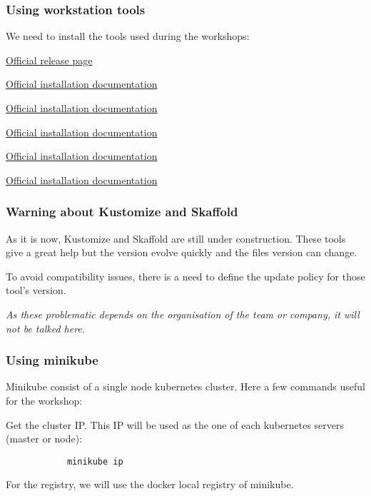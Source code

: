 \begin{frame}
	\frametitle{Using workstation tools}
	
	We need to install the tools used during the workshops:
	\begin{description}[leftmargin=!,labelwidth=\widthof{\bfseries Kustomize}]
		\item[Docker] \href{https://hub.docker.com/search/?type=edition&offering=community}{Official release page}
		\item[Kubectl] \href{https://kubernetes.io/docs/tasks/tools/install-kubectl/}{Official installation documentation}
		\item[Minikube] \href{https://kubernetes.io/docs/tasks/tools/install-minikube/}{Official installation documentation}
		\item[Kustomize] \href{https://github.com/kubernetes-sigs/kustomize/blob/master/docs/INSTALL.md}{Official installation documentation}
		\item[Skaffold] \href{https://skaffold.dev/docs/getting-started/\#installing-skaffold}{Official installation documentation}
		\item[Stern] \href{https://github.com/wercker/stern}{Official installation documentation}
	\end{description}	
\end{frame}

\begin{frame}
	\frametitle{Warning about Kustomize and Skaffold}
	
	As it is now, Kustomize and Skaffold are still under construction. These tools give a great help but the version evolve quickly and the files version can change.
	
	To avoid compatibility issues, there is a need to define the update policy for those tool's version.
	
	\bigskip
	
	\begin{center}
		\textit{As these problematic depends on the organisation of the team or company, it will not be talked here.}
	\end{center}
	
\end{frame}

\begin{frame}[fragile]
	\frametitle{Using minikube}
	
	Minikube consist of a single node kubernetes cluster. Here a few commands useful for the workshop:
	
	\begin{block}{Get the cluster IP. This IP will be used as the one of each kubernetes servers (master or node):}
		\begin{verbatim}
			minikube ip
		\end{verbatim}
	\end{block}
	
	\medskip
	For the registry, we will use the docker local registry of minikube.
\end{frame}